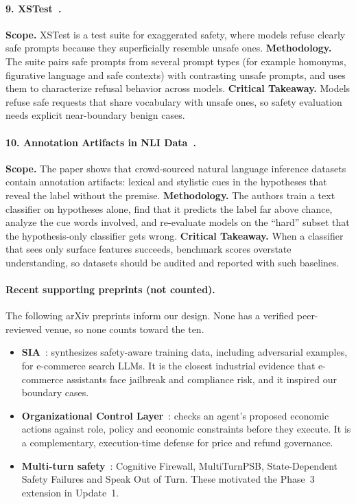 \documentclass[sigconf,nonacm]{acmart}
\begin{document}
\paragraph{9. XSTest~\cite{rottger2024xstest}.}
\textbf{Scope.} XSTest is a test suite for exaggerated safety, where models refuse clearly safe prompts because they superficially resemble unsafe ones.
\textbf{Methodology.} The suite pairs safe prompts from several prompt types (for example homonyms, figurative language and safe contexts) with contrasting unsafe prompts, and uses them to characterize refusal behavior across models.
\textbf{Critical Takeaway.} Models refuse safe requests that share vocabulary with unsafe ones, so safety evaluation needs explicit near-boundary benign cases.

\paragraph{10. Annotation Artifacts in NLI Data~\cite{gururangan2018annotation}.}
\textbf{Scope.} The paper shows that crowd-sourced natural language inference datasets contain annotation artifacts: lexical and stylistic cues in the hypotheses that reveal the label without the premise.
\textbf{Methodology.} The authors train a text classifier on hypotheses alone, find that it predicts the label far above chance, analyze the cue words involved, and re-evaluate models on the ``hard'' subset that the hypothesis-only classifier gets wrong.
\textbf{Critical Takeaway.} When a classifier that sees only surface features succeeds, benchmark scores overstate understanding, so datasets should be audited and reported with such baselines.

\paragraph{Recent supporting preprints (not counted).}
The following arXiv preprints inform our design. None has a verified peer-reviewed venue, so none counts toward the ten.
\begin{itemize}
  \item \textbf{SIA}~\cite{zhai2026sia}: synthesizes safety-aware training data, including adversarial examples, for e-commerce search LLMs. It is the closest industrial evidence that e-commerce assistants face jailbreak and compliance risk, and it inspired our boundary cases.
  \item \textbf{Organizational Control Layer}~\cite{shi2026ocl}: checks an agent's proposed economic actions against role, policy and economic constraints before they execute. It is a complementary, execution-time defense for price and refund governance.
  \item \textbf{Multi-turn safety}~\cite{sheoran2026multiturnpsb,li2026state,zhou2024speak,guida2026cognitive}: Cognitive Firewall, MultiTurnPSB, State-Dependent Safety Failures and Speak Out of Turn. These motivated the Phase~3 extension in Update~1.
\end{itemize}
\end{document}
